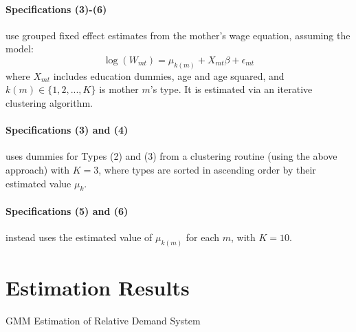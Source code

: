 \documentclass{article}
\begin{document}
\paragraph{Specifications (3)-(6)} use grouped fixed effect estimates from the mother's wage equation, assuming the model:
\[ \log(W_{mt}) = \mu_{k(m)} + X_{mt}\beta + \epsilon_{mt} \]
where $X_{mt}$ includes education dummies, age and age squared, and $k(m)\in\{1,2,...,K\}$ is mother $m$'s type. It is estimated via an iterative clustering algorithm.

\paragraph{Specifications (3) and (4)} uses dummies for Types (2) and (3) from a clustering routine (using the above approach) with $K=3$, where types are sorted in ascending order by their estimated value $\mu_{k}$.

\paragraph{Specifications (5) and (6)} instead uses the estimated value of $\mu_{k(m)}$ for each $m$, with $K=10$.


\section*{Estimation Results}

\begin{table}\footnotesize\caption{GMM Estimation of Relative Demand System}
    \begin{center}
        
        \captionsetup{width=0.7\textwidth}
    \end{center}
    \end{table}
\end{document}
